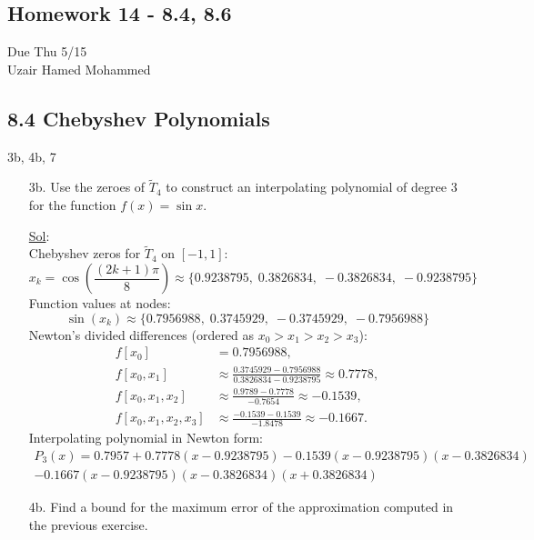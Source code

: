 \begin{center}
  \section*{Homework 14 - 8.4, 8.6}
  Due Thu 5/15 \\
  Uzair Hamed Mohammed
\end{center}

\subsection*{8.4 Chebyshev Polynomials}

3b, 4b, 7

\begin{enumerate}
  \item[3b.] Use the zeroes of \(\tilde{T}_4\) to construct an
    interpolating polynomial of degree 3 for the function \(f(x) = \sin x\).

    \underline{Sol}:\\
    Chebyshev zeros for \(\tilde{T}_4\) on \([-1,1]\):
    \[
      x_k = \cos\left(\frac{(2k+1)\pi}{8}\right) \approx
      \{0.9238795,\; 0.3826834,\; -0.3826834,\; -0.9238795\}
    \]
    Function values at nodes:
    \[
      \sin(x_k) \approx \{0.7956988,\; 0.3745929,\; -0.3745929,\; -0.7956988\}
    \]
    Newton's divided differences (ordered as \(x_0 > x_1 > x_2 > x_3\)):
    \[
      \begin{aligned}
        f[x_0] &= 0.7956988, \\
        f[x_0,x_1] &\approx \frac{0.3745929 - 0.7956988}{0.3826834 -
        0.9238795} \approx 0.7778, \\
        f[x_0,x_1,x_2] &\approx \frac{0.9789 - 0.7778}{-0.7654}
        \approx -0.1539, \\
        f[x_0,x_1,x_2,x_3] &\approx \frac{-0.1539 - 0.1539}{-1.8478}
        \approx -0.1667.
      \end{aligned}
    \]
    Interpolating polynomial in Newton form:
    \[
      \boxed{
        \begin{array}{l}
          P_3(x) = 0.7957 + 0.7778(x - 0.9238795) - 0.1539(x -
          0.9238795)(x - 0.3826834) \\ - 0.1667(x - 0.9238795)(x -
          0.3826834)(x + 0.3826834)
      \end{array}}
    \]

  \item[4b.] Find a bound for the maximum error of the approximation
    computed in the previous exercise.


\end{enumerate}
